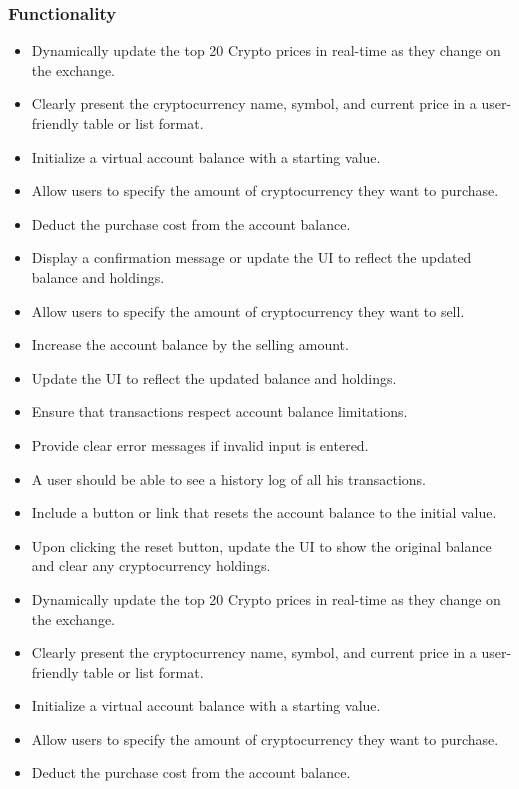 \documentclass[a4paper,12pt]{article}
\begin{document}
\subsubsection{Functionality}
\begin{itemize}
    \item Dynamically update the top 20 Crypto prices in real-time as they change on the exchange.
    \item Clearly present the cryptocurrency name, symbol, and current price in a user-friendly table or list format.
    \item Initialize a virtual account balance with a starting value.
    \item Allow users to specify the amount of cryptocurrency they want to purchase.
    \item Deduct the purchase cost from the account balance.
    \item Display a confirmation message or update the UI to reflect the updated balance and holdings.
    \item Allow users to specify the amount of cryptocurrency they want to sell.
    \item Increase the account balance by the selling amount.
    \item Update the UI to reflect the updated balance and holdings.
    \item Ensure that transactions respect account balance limitations.
    \item Provide clear error messages if invalid input is entered.
    \item A user should be able to see a history log of all his transactions.
    \item Include a button or link that resets the account balance to the initial value.
    \item Upon clicking the reset button, update the UI to show the original balance and clear any cryptocurrency holdings.
    \item Dynamically update the top 20 Crypto prices in real-time as they change on the exchange.
    \item Clearly present the cryptocurrency name, symbol, and current price in a user-friendly table or list format.
    \item Initialize a virtual account balance with a starting value.
    \item Allow users to specify the amount of cryptocurrency they want to purchase.
    \item Deduct the purchase cost from the account balance.

\end{itemize}
\end{document}
